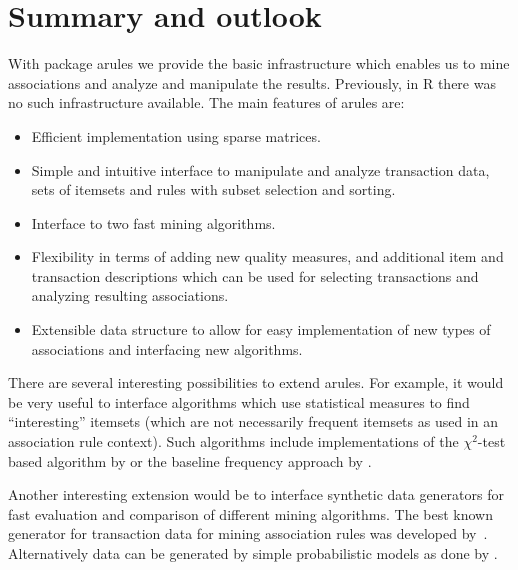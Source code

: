 \documentclass[10pt,a4paper]{article}
\newcommand{\strong}[1]{{\normalfont\fontseries{b}\selectfont #1}}
\newcommand{\pkg}[1]{\strong{#1}}
\newcommand{\proglang}[1]{\textsf{#1}}
\begin{document}

\section{Summary and outlook\label{sec:conclusion}}

With package \pkg{arules} we
provide the basic infrastructure which enables us to 
mine associations and analyze and manipulate the results. 
Previously, in \proglang{R} there was no such infrastructure available.
The main features of \pkg{arules} are:

\begin{itemize}
 \item Efficient implementation using sparse matrices.
 \item Simple and intuitive interface to manipulate and analyze
  transaction data, sets of itemsets and rules with subset selection and
  sorting.
 \item Interface to two fast mining algorithms.
 \item Flexibility in terms of adding new quality measures, and
  additional item and transaction descriptions which can be used for
  selecting transactions and analyzing resulting associations.
 \item Extensible data structure to allow for easy implementation of new
  types of associations and interfacing new algorithms.
\end{itemize}

There are several interesting possibilities to extend \pkg{arules}.  For
example, it would be very useful to interface algorithms which use
statistical measures to find ``interesting'' itemsets (which are not
necessarily frequent itemsets as used in an association rule context).
Such algorithms include implementations of the $\chi^2$-test based
algorithm by \cite{arules:Silverstein+Brin+Motwani:1998} or the baseline
frequency approach by \cite{arules:DuMouchel+Pregibon2001}.

Another interesting extension would be to interface synthetic data 
generators for fast evaluation and comparison of different mining algorithms.
The best known generator for
transaction data for mining association rules
was developed by~\cite{arules:Agrawal+Srikant:1994}.
Alternatively data can be generated by simple probabilistic models 
as done by
\cite{arules:Hahsler+Hornik+Reutterer:2005}.
\end{document}
